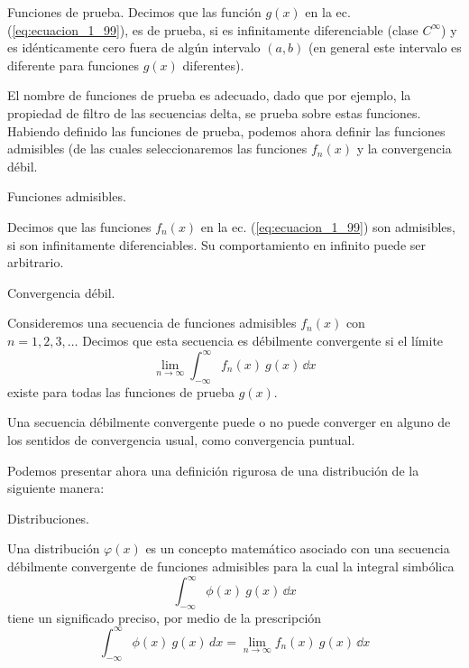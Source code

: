 \documentclass[12pt]{beamer}
\begin{document}
\begin{defi}
Funciones de prueba.
Decimos que las función $g(x)$ en la ec. (\ref{eq:ecuacion_1_99}), es de prueba, si es infinitamente diferenciable (clase $C^{\infty}$) y es idénticamente cero fuera de algún intervalo $(a, b)$ (en general este intervalo es diferente para funciones $g(x)$ diferentes).
\end{defi}
El nombre de funciones de prueba es adecuado, dado que por ejemplo, la propiedad de filtro de las secuencias delta, se prueba sobre estas funciones. Habiendo definido las funciones de prueba, podemos ahora definir las funciones admisibles (de las cuales seleccionaremos las funciones $f_{n}(x)$ y la convergencia débil.
\begin{defi}
Funciones admisibles.

Decimos que las funciones $f_{n}(x)$ en la ec. (\ref{eq:ecuacion_1_99}) son admisibles, si son infinitamente diferenciables. Su comportamiento en infinito puede ser arbitrario.
\end{defi}
\begin{defi}
Convergencia débil.

Consideremos una secuencia de funciones admisibles $f_{n}(x)$ con \\ $n = 1, 2, 3, \ldots$
Decimos que esta secuencia es débilmente convergente si el límite
\begin{equation}
\lim_{n \to \infty} \int_{-\infty}^{\infty} f_{n}(x) \:  g(x) \, \dd{x}
\label{eq:ecuacion_1_100}
\end{equation}
existe para todas las funciones de prueba $g(x)$.
\end{defi}
Una secuencia débilmente convergente puede o no puede converger en alguno de los sentidos de convergencia usual, como convergencia puntual.
\par
Podemos presentar ahora una definición rigurosa de una distribución de la siguiente manera:
\begin{defi}
Distribuciones.

Una distribución $\varphi (x)$ es un concepto matemático asociado con una secuencia débilmente convergente de funciones admisibles para la cual la integral simbólica
\begin{equation}
\int_{-\infty}^{\infty} \phi (x) \:  g(x) \, \dd{x}
\label{eq:ecuacion_1_101}
\end{equation}
tiene un significado preciso, por medio de la prescripción
\begin{equation}
\int_{-\infty}^{\infty} \phi (x) \: g(x) \, dx = \lim_{n \to \infty} f_{n}(x) \: g(x) \, \dd{x}
\label{eq:ecuacion_1_102}
\end{equation}
\end{defi}
\end{document}
